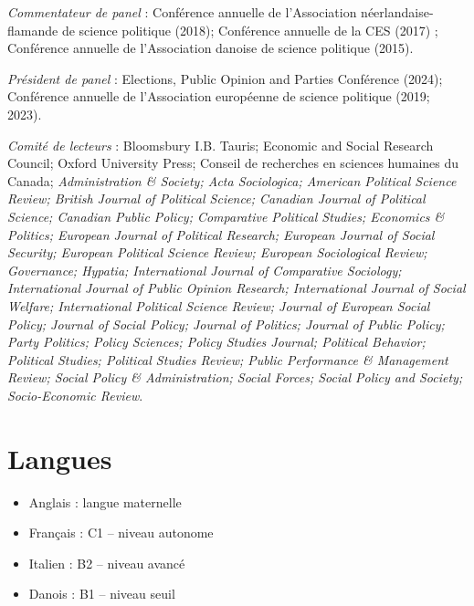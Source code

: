 \documentclass[letterpaper,fontsize=10.5pt]{scrartcl}
\begin{document}
{}\textit{Commentateur de panel} : Conférence annuelle de l'Association néerlandaise-flamande de science politique (2018); Conférence annuelle de la CES (2017) ; Conférence annuelle de l'Association danoise de science politique (2015).\\ 
\hfill \break
{}
{}\textit{Président de panel} : Elections, Public Opinion and Parties Conférence (2024); Conférence annuelle de l'Association européenne de science politique (2019; 2023).\\ 
\hfill \break
{}
{}\textit{Comité de lecteurs} : Bloomsbury I.B. Tauris; Economic and Social Research Council; Oxford University Press; Conseil de recherches en sciences humaines du Canada; \textit{Administration \& Society; Acta Sociologica; American Political Science Review; British Journal of Political Science; Canadian Journal of Political Science; Canadian Public Policy; Comparative Political Studies; Economics \& Politics; European Journal of Political Research; European Journal of Social Security; European Political Science Review; European Sociological Review; Governance; Hypatia; International Journal of Comparative Sociology; International Journal of Public Opinion Research; International Journal of Social Welfare; International Political Science Review; Journal of European Social Policy; Journal of Social Policy; Journal of Politics; Journal of Public Policy; Party Politics; Policy Sciences; Policy Studies Journal; Political Behavior; Political Studies; Political Studies Review; Public Performance \& Management Review; Social Policy \& Administration; Social Forces; Social Policy and Society; Socio-Economic Review}.

\section{Langues}
\begin{itemize}[itemsep=0em, topsep=0em, partopsep=0em]
	\item Anglais : langue maternelle
	\item Français : C1 -- niveau autonome
	\item Italien : B2 -- niveau avancé
	\item Danois : B1 -- niveau seuil \\
\end{itemize}
\end{document}
